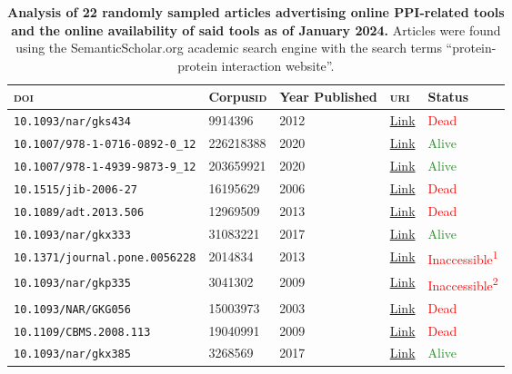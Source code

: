 \begin{table}[!h]
\centering
	\caption[Analysis of online availability of \textsc{ppi}-related tools.]{\textsf{\textbf{Analysis of 22 randomly sampled articles advertising online PPI-related tools and the online availability of said tools as of January 2024.}} Articles were found using the SemanticScholar.org academic search engine with the search terms ``protein-protein interaction website''.} \label{tab:intrepppid_supp_links} {\begin{tabular}{@{}lllll@{}}\toprule 
			\textsc{doi} & Corpus\textsc{id} & Year Published & \textsc{uri} & Status  \\\midrule
			\texttt{10.1093/nar/gks434} & 9914396 & 2012 & \href{http://dropnet.isima.fr/}{Link} & \textcolor{red}{Dead} \\
            \texttt{10.1007/978-1-0716-0892-0\_12} & 226218388 & 2020 & \href{http://wodaklab.org/iRefWeb}{Link} & \textcolor{ForestGreen}{Alive} \\
            \texttt{10.1007/978-1-4939-9873-9\_12} & 203659921 & 2020 & \href{https://oncoppi.emory.edu/}{Link} & \textcolor{ForestGreen}{Alive} \\
            \texttt{10.1515/jib-2006-27} & 16195629 & 2006 & \href{http://biomis.fh-hagenberg.at/isp/primos}{Link} & \textcolor{red}{Dead} \\
            \texttt{10.1089/adt.2013.506} & 12969509 & 2013 & \href{http://primos.fh-hagenberg.at/}{Link} & \textcolor{red}{Dead} \\
            \texttt{10.1093/nar/gkx333} & 31083221 & 2017 & \href{https://proteins.plus/}{Link} & \textcolor{ForestGreen}{Alive} \\
            \texttt{10.1371/journal.pone.0056228} & 2014834 & 2013 & \href{http://www.canevolve.org/}{Link} & \textcolor{red}{Inaccessible\textsuperscript{1}} \\
            \texttt{10.1093/nar/gkp335} & 3041302 & 2009 & \href{https://meme.nbcr.net/}{Link} & \textcolor{red}{Inaccessible\textsuperscript{2}} \\
            \texttt{10.1093/NAR/GKG056} & 15003973 & 2003 & \href{http://www.bind.ca/}{Link} & \textcolor{red}{Dead} \\
            \texttt{10.1109/CBMS.2008.113} & 19040991 & 2009 & \href{http://212.189.149.159:8080/mcl_service}{Link} & \textcolor{red}{Dead} \\
            \texttt{10.1093/nar/gkx385} & 3268569 & 2017 & \href{http://dynomics.pitt.edu/}{Link} & \textcolor{ForestGreen}{Alive} \\

\end{tabular}}
\end{table}
